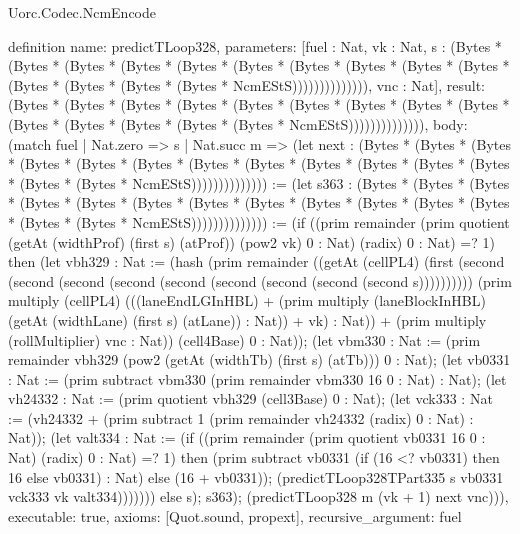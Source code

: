 \begin{lexlean}{Uorc.Codec.NcmEncode}
\begin{semanticmodule}
definition{
  name: predictTLoop328,
  parameters: [fuel : Nat, vk : Nat, s : (Bytes * (Bytes * (Bytes * (Bytes * (Bytes * (Bytes * (Bytes * (Bytes * (Bytes * (Bytes * (Bytes * (Bytes * (Bytes * (Bytes * NcmEStS)))))))))))))), vnc : Nat],
  result: (Bytes * (Bytes * (Bytes * (Bytes * (Bytes * (Bytes * (Bytes * (Bytes * (Bytes * (Bytes * (Bytes * (Bytes * (Bytes * (Bytes * NcmEStS)))))))))))))),
  body: (match fuel
    | Nat.zero => s
    | Nat.succ m => (let next : (Bytes * (Bytes * (Bytes * (Bytes * (Bytes * (Bytes * (Bytes * (Bytes * (Bytes * (Bytes * (Bytes * (Bytes * (Bytes * (Bytes * NcmEStS)))))))))))))) := (let s363 : (Bytes * (Bytes * (Bytes * (Bytes * (Bytes * (Bytes * (Bytes * (Bytes * (Bytes * (Bytes * (Bytes * (Bytes * (Bytes * (Bytes * NcmEStS)))))))))))))) := (if ((prim remainder (prim quotient (getAt (widthProf) (first s) (atProf)) (pow2 vk) 0 : Nat) (radix) 0 : Nat) =? 1) then (let vbh329 : Nat := (hash (prim remainder ((getAt (cellPL4) (first (second (second (second (second (second (second (second (second (second s)))))))))) (prim multiply (cellPL4) (((laneEndLGInHBL) + (prim multiply (laneBlockInHBL) (getAt (widthLane) (first s) (atLane)) : Nat)) + vk) : Nat)) + (prim multiply (rollMultiplier) vnc : Nat)) (cell4Base) 0 : Nat)); (let vbm330 : Nat := (prim remainder vbh329 (pow2 (getAt (widthTb) (first s) (atTb))) 0 : Nat); (let vb0331 : Nat := (prim subtract vbm330 (prim remainder vbm330 16 0 : Nat) : Nat); (let vh24332 : Nat := (prim quotient vbh329 (cell3Base) 0 : Nat); (let vck333 : Nat := (vh24332 + (prim subtract 1 (prim remainder vh24332 (radix) 0 : Nat) : Nat)); (let valt334 : Nat := (if ((prim remainder (prim quotient vb0331 16 0 : Nat) (radix) 0 : Nat) =? 1) then (prim subtract vb0331 (if (16 <? vb0331) then 16 else vb0331) : Nat) else (16 + vb0331)); (predictTLoop328TPart335 s vb0331 vck333 vk valt334))))))) else s); s363); (predictTLoop328 m (vk + 1) next vnc))),
  executable: true,
  axioms: [Quot.sound, propext],
  recursive_argument: fuel
}


\end{semanticmodule}
\end{lexlean}
